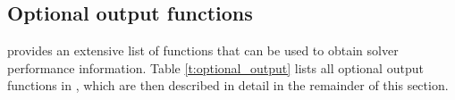 \subsection{Optional output functions}\label{ss:optional_output}

{\cvode} provides an extensive list of functions that can be used to obtain
solver performance information.
Table \ref{t:optional_output} lists all optional output functions in {\cvode},
which are then described in detail in the remainder of this section.

\newlength{\colABC}
\settowidth{\colABC}{No. of r.h.s. calls for finite diff. Jacobian-vector evals.}
\newlength{\colDEF}

\newpage
{}
\label{t:optional_output}
\tablelasttail{\hline}

